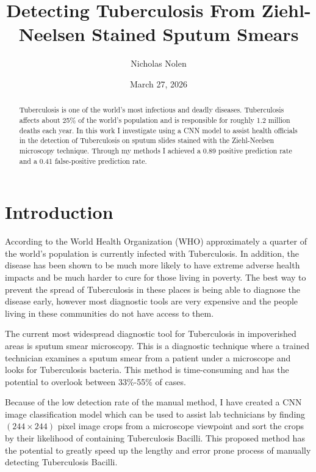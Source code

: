 \documentclass{article}
\title{Detecting Tuberculosis From Ziehl-Neelsen Stained Sputum Smears}
\author{Nicholas Nolen}
\date{March 27, 2026}
\begin{document}
\maketitle

\begin{abstract}

Tuberculosis is one of the world's most infectious and deadly diseases. Tuberculosis affects about 25\% of the world's population and is responsible for 
roughly 1.2 million deaths each year. In this work I investigate using a CNN model to assist health officials in the detection of Tuberculosis 
on sputum slides stained with the Ziehl-Neelsen microscopy technique. Through my methods I achieved a 0.89 positive prediction rate and a 0.41 false-positive prediction rate.
\end{abstract}

\section{Introduction}

According to the World Health Organization (WHO) approximately a quarter of the world's population is 
currently infected with Tuberculosis. In addition, the disease has been shown to be much more likely to 
have extreme adverse health impacts and be much harder to cure for those living in poverty. The best way to
prevent the spread of Tuberculosis in these places is being able to diagnose the disease early, however most diagnostic tools are very
expensive and the people living in these communities do not have access to them.

The current most widespread diagnostic tool for Tuberculosis in impoverished areas is sputum smear microscopy. 
This is a diagnostic technique where a trained technician examines a sputum smear from a patient under a microscope
and looks for Tuberculosis bacteria. This method is time-consuming and has the potential to overlook between 33\%-55\% of cases.

Because of the low detection rate of the manual method, I have created a CNN image classification model which can be used
to assist lab technicians by finding $(244 \times 244)$ pixel image crops from a microscope viewpoint and sort the crops
by their likelihood of containing Tuberculosis Bacilli. This proposed method has the potential to greatly speed up the lengthy and error
prone process of manually detecting Tuberculosis Bacilli.
\end{document}
